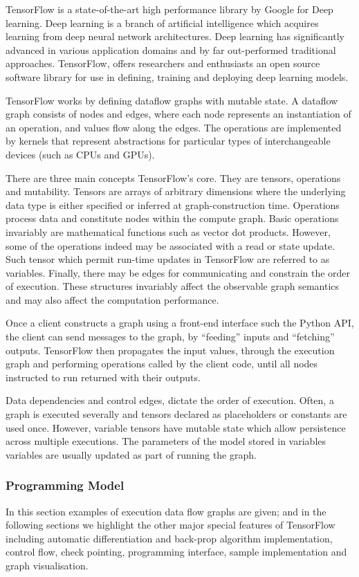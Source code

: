 TensorFlow is a state-of-the-art high performance library by Google for Deep learning.  Deep learning is a branch of artificial intelligence which acquires learning from deep neural network architectures. Deep learning has significantly advanced in various application domains and by far out-performed traditional approaches.  TensorFlow, offers researchers and enthusiasts an open source software library for use in defining, training and deploying deep learning models.

TensorFlow works by defining dataflow graphs with mutable state.  A dataflow graph consists of nodes and edges, where each node represents an instantiation of an operation, and values flow along the edges. The operations are implemented by kernels that represent abstractions for particular types of interchangeable devices (such as CPUs and GPUs).

There are three main concepts TensorFlow's core.  They are tensors, operations and mutability.  Tensors are arrays of arbitrary dimensions where the underlying data type is either specified or inferred at graph-construction time. Operations process data and constitute nodes within the compute graph. Basic operations invariably are mathematical functions such as vector dot products.  However, some of the operations indeed may be associated with a read or state update. Such tensor which permit run-time updates in TensorFlow are referred to as variables.  Finally, there may be edges for communicating and constrain the order of execution. These structures invariably affect the observable graph semantics and may also affect the computation performance. 

Once a client constructs a graph using a front-end interface such the Python API, the client can send messages to the graph, by “feeding” inputs and “fetching” outputs. TensorFlow then propagates the input values, through the execution graph and performing  operations called by the client code, until all nodes instructed to run returned with their outputs. 

Data dependencies and control edges, dictate the order of execution. Often, a graph is executed severally and tensors declared as placeholders or constants are used once. However, variable tensors have mutable state which allow persistence across multiple executions. The parameters of the model stored in variables variables are usually updated as part of running the graph.

\subsubsection{Programming Model}
In this section examples of execution data flow graphs are given; and in the following sections we highlight the other major special features of TensorFlow including automatic differentiation and back-prop algorithm implementation, control flow, check pointing, programming interface, sample implementation and graph visualisation.

